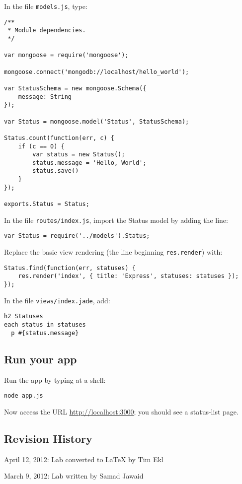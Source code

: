 \documentclass{article}
\begin{document}
In the file \verb!models.js!, type:

\begin{verbatim}
/**
 * Module dependencies.
 */

var mongoose = require('mongoose');

mongoose.connect('mongodb://localhost/hello_world');

var StatusSchema = new mongoose.Schema({
    message: String
});

var Status = mongoose.model('Status', StatusSchema);

Status.count(function(err, c) {
    if (c == 0) {
        var status = new Status();
        status.message = 'Hello, World';
        status.save()
    }
});

exports.Status = Status;
\end{verbatim}


In the file \verb!routes/index.js!, import the Status model by adding the line:

\begin{verbatim}
var Status = require('../models').Status;
\end{verbatim}

Replace the basic view rendering (the line beginning \verb!res.render!) with:

\begin{verbatim}
Status.find(function(err, statuses) {
    res.render('index', { title: 'Express', statuses: statuses });
});
\end{verbatim}

In the file \verb!views/index.jade!, add:

\begin{verbatim}
h2 Statuses
each status in statuses
  p #{status.message}
\end{verbatim}

\subsection*{Run your app}

Run the app by typing at a shell:

\begin{verbatim}
node app.js
\end{verbatim}

Now access the URL \href{http://localhost:3000/}{http://localhost:3000}; you should see a status-list page.



\subsection*{Revision History}
\begin{itemize*}
 \item April 12, 2012: Lab converted to LaTeX by Tim Ekl
 \item March 9, 2012: Lab written by Samad Jawaid
\end{itemize*}
\end{document}
